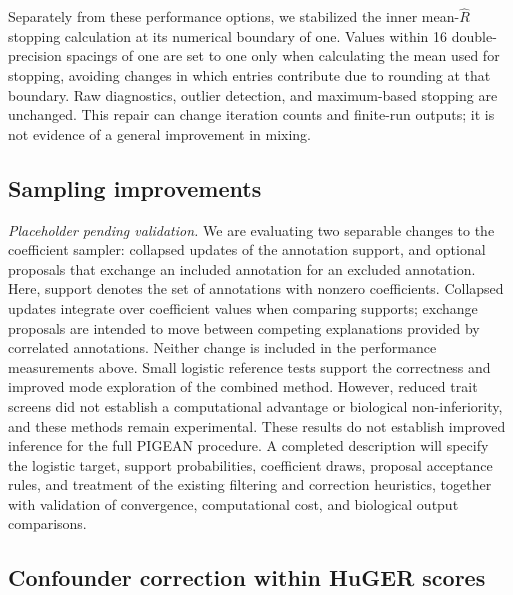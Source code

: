 \documentclass[11pt]{article}
\begin{document}
{Separately from these performance options, we stabilized the inner
mean-$\hat R$ stopping calculation at its numerical boundary of one.
Values within 16 double-precision spacings of one are set to one only
when calculating the mean used for stopping, avoiding changes in which
entries contribute due to rounding at that boundary. Raw diagnostics,
outlier detection, and maximum-based stopping are unchanged. This repair
can change iteration counts and finite-run outputs; it is not evidence
of a general improvement in mixing.

\subsection{Sampling improvements}
\label{sec:sampling-improvements}

\emph{Placeholder pending validation.} We are evaluating two separable
changes to the coefficient sampler: collapsed updates of the annotation
support, and optional proposals that exchange an included annotation for
an excluded annotation. Here, support denotes the set of annotations
with nonzero coefficients. Collapsed updates integrate over coefficient
values when comparing supports; exchange proposals are intended to move
between competing explanations provided by correlated annotations.
Neither change is included in the performance measurements above.
Small logistic reference tests support the correctness and improved mode
exploration of the combined method. However, reduced trait screens did
not establish a computational advantage or biological non-inferiority,
and these methods remain experimental. These results do not establish
improved inference for the full PIGEAN procedure. A completed
description will specify the logistic target, support probabilities,
coefficient draws, proposal acceptance rules, and treatment of the
existing filtering and correction heuristics, together with validation
of convergence, computational cost, and biological output comparisons.

\subsection{Confounder correction within HuGER scores}

}
\end{document}
